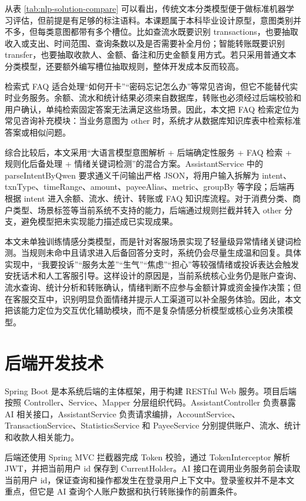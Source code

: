 \documentclass[bachelor, print]{xduthesis}
\begin{document}
从表 \ref{tab:nlp-solution-compare} 可以看出，传统文本分类模型便于做标准机器学习评估，但前提是有足够的标注语料。本课题属于本科毕业设计原型，意图类别并不多，但每类意图都带有多个槽位。比如查流水既要识别 transactions，也要抽取收入或支出、时间范围、查询条数以及是否需要补全月份；智能转账既要识别 transfer，也要抽取收款人、金额、备注和历史金额复用方式。若只采用普通文本分类模型，还要额外编写槽位抽取规则，整体开发成本反而较高。

检索式 FAQ 适合处理“如何开卡”“密码忘记怎么办”等常见咨询，但它不能替代实时业务服务。余额、流水和统计结果必须来自数据库，转账也必须经过后端校验和用户确认，单纯检索固定答案无法满足这些场景。因此，本文把 FAQ 检索定位为常见咨询补充模块：当业务意图为 other 时，系统才从数据库知识库表中检索标准答案或相似问题。

综合比较后，本文采用“大语言模型意图解析 + 后端确定性服务 + FAQ 检索 + 规则化后备处理 + 情绪关键词检测”的混合方案。AssistantService 中的 parseIntentByQwen 要求通义千问输出严格 JSON，将用户输入拆解为 intent、txnType、timeRange、amount、payeeAlias、metric、groupBy 等字段；后端再根据 intent 进入余额、流水、统计、转账或 FAQ 知识库流程。对于消费分类、商户类型、场景标签等当前系统不支持的能力，后端通过规则拦截并转入 other 分支，避免模型把未实现能力描述成已实现成果。

本文未单独训练情感分类模型，而是针对客服场景实现了轻量级异常情绪关键词检测。当规则未命中且请求进入后备回答分支时，系统仍会尽量生成温和回复。具体实现中，“我要投诉”“服务太差”“生气”“焦虑”“担心”等较强情绪或投诉表达会触发安抚话术和人工客服引导。这样设计的原因是，当前系统核心业务仍是账户查询、流水查询、统计分析和转账确认，情绪判断不应参与金额计算或资金操作决策；但在客服交互中，识别明显负面情绪并提示人工渠道可以补全服务体验。因此，本文把该能力定位为交互优化辅助模块，而不是复杂情感分析模型或核心业务决策模型。

\section{后端开发技术}

Spring Boot 是本系统后端的主体框架，用于构建 RESTful Web 服务\cite{springboot}。项目后端按照 Controller、Service、Mapper 分层组织代码。AssistantController 负责暴露 AI 相关接口，AssistantService 负责请求编排，AccountService、TransactionService、StatisticsService 和 PayeeService 分别提供账户、流水、统计和收款人相关能力。

后端还使用 Spring MVC 拦截器完成 Token 校验，通过 TokenInterceptor 解析 JWT，并把当前用户 id 保存到 CurrentHolder。AI 接口在调用业务服务前会读取当前用户 id，保证查询和操作都发生在登录用户上下文中。登录鉴权并不是本文重点，但它是 AI 查询个人账户数据和执行转账操作的前置条件。
\end{document}
